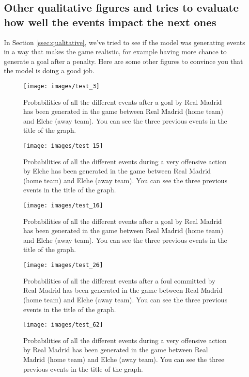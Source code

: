 \documentclass[10pt,conference,onecolumn]{IEEEtran}
\begin{document}
\begin{appendices}
\section{Other qualitative figures and tries to evaluate how well the events impact the next ones}
\label{appendix:qualitative}
In Section \ref{ssec:qualitative}, we've tried to see if the model was generating events in a way that makes the game realistic, for example having more chance to generate a goal after a penalty. Here are some other figures to convince you that the model is doing a good job.

\begin{figure}[H]
\centering
\texttt{[image: images/test\_3]}
\caption{Probabilities of all the different events after a goal by Real Madrid has been generated in the game between Real Madrid (home team) and Elche (away team). You can see the three previous events in the title of the graph.}
\label{fig:test_3}
\end{figure}

\begin{figure}[H]
\centering
\texttt{[image: images/test\_15]}
\caption{Probabilities of all the different events during a very offensive action by Elche has been generated in the game between Real Madrid (home team) and Elche (away team). You can see the three previous events in the title of the graph.}
\label{fig:test_15}
\end{figure}

\begin{figure}[H]
\centering
\texttt{[image: images/test\_16]}
\caption{Probabilities of all the different events after a goal by Real Madrid has been generated in the game between Real Madrid (home team) and Elche (away team). You can see the three previous events in the title of the graph.}
\label{fig:test_16}
\end{figure}

\begin{figure}[H]
\centering
\texttt{[image: images/test\_26]}
\caption{Probabilities of all the different events after a foul committed by Real Madrid has been generated in the game between Real Madrid (home team) and Elche (away team). You can see the three previous events in the title of the graph.}
\label{fig:test_26}
\end{figure}

\begin{figure}[H]
\centering
\texttt{[image: images/test\_62]}
\caption{Probabilities of all the different events during a very offensive action by Real Madrid has been generated in the game between Real Madrid (home team) and Elche (away team). You can see the three previous events in the title of the graph.}
\label{fig:test_62}
\end{figure}


\end{appendices}
\end{document}
